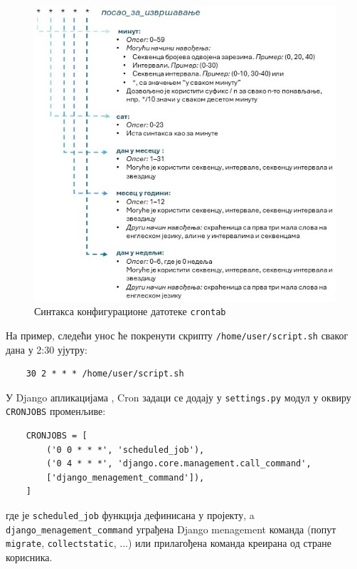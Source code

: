 \documentclass[12pt,oneside]{memoir}
\begin{document}
\begin{figure}[h]
  \centering
  \includegraphics[scale=0.9]{assets/pictures/crontab_syntax.jpg}
  \caption{Синтакса конфигурационе датотеке \texttt{crontab}}
  \label{pic:crontab_syntax}
\end{figure}

На пример, следећи унос ће покренути скрипту \texttt{/home/user/script.sh} сваког дана у 2:30 ујутру:

\begin{lstlisting}
    30 2 * * * /home/user/script.sh
\end{lstlisting}

У Django апликацијама \cite{django_crontab}, Cron задаци се додају у \texttt{settings.py} модул у оквиру \texttt{CRONJOBS} променљиве:

\begin{lstlisting}
    CRONJOBS = [
        ('0 0 * * *', 'scheduled_job'),
        ('0 4 * * *', 'django.core.management.call_command',
        ['django_menagement_command']),
    ]
\end{lstlisting}

где је \texttt{scheduled\_job} функција дефинисана у пројекту, a \\
\texttt{django\_menagement\_command} уграђена Django menagement команда (попут \\ 
\texttt{migrate}, \texttt{collectstatic}, ...) или прилагођена команда креирана од стране корисника.
\end{document}
